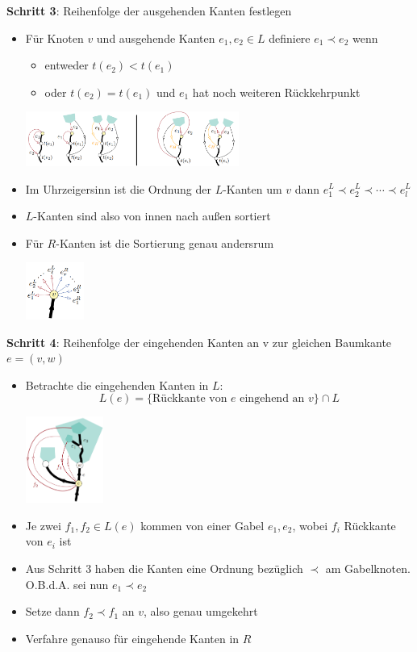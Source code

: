 \textbf{Schritt 3}: Reihenfolge der ausgehenden Kanten festlegen
\begin{itemize}
	\item Für Knoten $v$ und ausgehende Kanten $e_1,e_2\in L$ definiere $e_1\prec e_2$ wenn
	\begin{itemize}
		\item entweder $t(e_2)<t(e_1)$
		\item oder $t(e_2)=t(e_1)$ und $e_1$ hat noch weiteren Rückkehrpunkt
	\end{itemize}
	\begin{center}
		\includegraphics[width=0.55\textwidth]{images/lr-5.png}
	\end{center}
	\item Im Uhrzeigersinn ist die Ordnung der $L$-Kanten um $v$ dann $e_1^L\prec e_2^L\prec\cdots\prec e_l^L$
	\item $L$-Kanten sind also von innen nach außen sortiert
	\item Für $R$-Kanten ist die Sortierung genau andersrum
	\begin{center}
		\includegraphics[width=0.15\textwidth]{images/lr-6.png}
	\end{center}
\end{itemize}

\textbf{Schritt 4}: Reihenfolge der eingehenden Kanten an v zur gleichen Baumkante $e=(v,w)$
\begin{itemize}
	\item Betrachte die eingehenden Kanten in $L$: $$L(e)=\{\text{Rückkante von }e\text{ eingehend an }v\}\cap L$$
	\begin{center}
		\includegraphics[width=0.2\textwidth]{images/lr-7.png}
	\end{center}
	\item Je zwei $f_1,f_2\in L(e)$ kommen von einer Gabel $e_1,e_2$, wobei $f_i$ Rückkante von $e_i$ ist
	\item Aus Schritt 3 haben die Kanten eine Ordnung bezüglich $\prec$ am Gabelknoten. O.B.d.A. sei nun $e_1\prec e_2$
	\item Setze dann $f_2\prec f_1$ an $v$, also genau umgekehrt
	\item Verfahre genauso für eingehende Kanten in $R$
\end{itemize}

